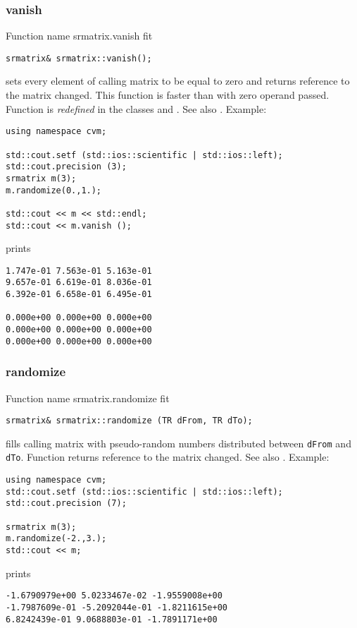 \subsubsection{vanish}
Function%
\pdfdest name {srmatrix.vanish} fit
\begin{verbatim}
srmatrix& srmatrix::vanish();
\end{verbatim}
sets every element of  calling matrix to be equal to zero
and returns  reference to
the matrix changed. This function is faster
than
with zero operand passed.
Function is \emph{redefined} in the classes
 and
.
See also .
Example:
\begin{Verbatim}
using namespace cvm;

std::cout.setf (std::ios::scientific | std::ios::left); 
std::cout.precision (3);
srmatrix m(3);
m.randomize(0.,1.);

std::cout << m << std::endl;
std::cout << m.vanish ();
\end{Verbatim}
prints
\begin{Verbatim}
1.747e-01 7.563e-01 5.163e-01
9.657e-01 6.619e-01 8.036e-01
6.392e-01 6.658e-01 6.495e-01

0.000e+00 0.000e+00 0.000e+00
0.000e+00 0.000e+00 0.000e+00
0.000e+00 0.000e+00 0.000e+00
\end{Verbatim}
\newpage




\subsubsection{randomize}
Function%
\pdfdest name {srmatrix.randomize} fit
\begin{verbatim}
srmatrix& srmatrix::randomize (TR dFrom, TR dTo);
\end{verbatim}
fills  calling matrix with pseudo-random numbers distributed between
\verb"dFrom" and \verb"dTo".
Function
returns  reference to the matrix changed.
See also
.
Example:
\begin{Verbatim}
using namespace cvm;
std::cout.setf (std::ios::scientific | std::ios::left); 
std::cout.precision (7);

srmatrix m(3);
m.randomize(-2.,3.);
std::cout << m;
\end{Verbatim}
prints
\begin{Verbatim}
-1.6790979e+00 5.0233467e-02 -1.9559008e+00
-1.7987609e-01 -5.2092044e-01 -1.8211615e+00
6.8242439e-01 9.0688803e-01 -1.7891171e+00
\end{Verbatim}
\newpage

